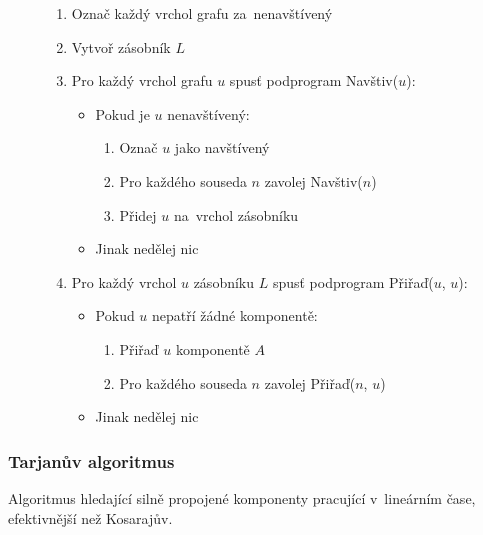 \begin{figure}[ht]
\onehalfspacing
\begin{enumerate}
\item Označ každý vrchol grafu za~nenavštívený
\item Vytvoř zásobník $L$
\item Pro každý vrchol grafu $u$ spusť podprogram Navštiv($u$):
    \begin{itemize}
    \item Pokud je $u$ nenavštívený:
        \begin{enumerate}
        \item Označ $u$ jako navštívený
        \item Pro každého souseda $n$ zavolej Navštiv($n$)
        \item Přidej $u$ na~vrchol zásobníku
        \end{enumerate}
    \item Jinak nedělej nic
    \end{itemize}
\item Pro každý vrchol $u$ zásobníku $L$ spusť podprogram Přiřaď($u$, $u$):
    \begin{itemize}
    \item Pokud $u$ nepatří žádné komponentě:
        \begin{enumerate}
        \item Přiřaď $u$ komponentě $A$
        \item Pro každého souseda $n$ zavolej Přiřaď($n$, $u$)
        \end{enumerate}
    \item Jinak nedělej nic
    \end{itemize}
\end{enumerate}
\end{figure}
\FloatBarrier

\subsubsection{Tarjanův algoritmus}

Algoritmus hledající silně propojené komponenty pracující v~lineárním čase, efektivnější než Kosarajův.


